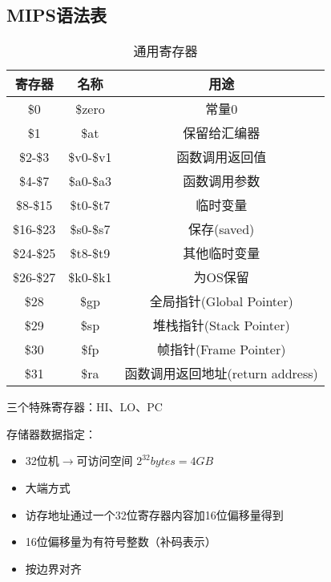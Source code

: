 \subsection{MIPS语法表}
\begin{table}
\centering
\caption{通用寄存器}
\begin{tabular}{|c|c|c|}
\hline
寄存器 & 名称 & 用途\\\hline
\$0 & \$zero & 常量0\\\hline
\$1 & \$at & 保留给汇编器\\\hline
\$2-\$3 & \$v0-\$v1 & 函数调用返回值\\\hline
\$4-\$7 & \$a0-\$a3 & 函数调用参数\\\hline
\$8-\$15 & \$t0-\$t7 & 临时变量\\\hline
\$16-\$23 & \$s0-\$s7 & 保存(saved)\\\hline
\$24-\$25 & \$t8-\$t9 & 其他临时变量\\\hline
\$26-\$27 & \$k0-\$k1 & 为OS保留\\\hline
\$28 & \$gp & 全局指针(Global Pointer)\\\hline
\$29 & \$sp & 堆栈指针(Stack Pointer)\\\hline
\$30 & \$fp & 帧指针(Frame Pointer)\\\hline
\$31 & \$ra & 函数调用返回地址(return address)\\\hline
\end{tabular}
\end{table}
三个特殊寄存器：HI、LO、PC\par
存储器数据指定：
\begin{itemize}
	\item 32位机$\to$可访问空间 $2^{32}bytes=4GB$
	\item 大端方式
	\item 访存地址通过一个32位寄存器内容加16位偏移量得到
	\item 16位偏移量为有符号整数（补码表示）
	\item 按边界对齐
\end{itemize}

